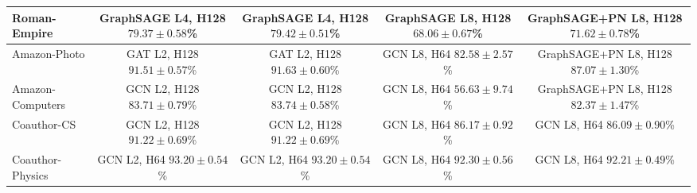 \documentclass[english]{lni}
\begin{document}
\begin{landscape}
\begin{table}[p]
\begin{tabular*}{\linewidth}{@{\extracolsep{\fill}}lcccc@{}}
Roman-Empire &
\makecell{GraphSAGE\\L4, H128\\$79.37\pm0.58$\%} &
\makecell{GraphSAGE\\L4, H128\\$79.42\pm0.51$\%} &
\makecell{GraphSAGE\\L8, H128\\$68.06\pm0.67$\%} &
\makecell{GraphSAGE+PN\\L8, H128\\$71.62\pm0.78$\%}\\
\midrule

Amazon-Photo &
\makecell{GAT\\L2, H128\\$91.51\pm0.57$\%} &
\makecell{GAT\\L2, H128\\$91.63\pm0.60$\%} &
\makecell{GCN\\L8, H64\\$82.58\pm2.57$\%} &
\makecell{GraphSAGE+PN\\L8, H128\\$87.07\pm1.30$\%}\\
\midrule

Amazon-Computers &
\makecell{GCN\\L2, H128\\$83.71\pm0.79$\%} &
\makecell{GCN\\L2, H128\\$83.74\pm0.58$\%} &
\makecell{GCN\\L8, H64\\$56.63\pm9.74$\%} &
\makecell{GraphSAGE+PN\\L8, H128\\$82.37\pm1.47$\%}\\
\midrule

Coauthor-CS &
\makecell{GCN\\L2, H128\\$91.22\pm0.69$\%} &
\makecell{GCN\\L2, H128\\$91.22\pm0.69$\%} &
\makecell{GCN\\L8, H64\\$86.17\pm0.92$\%} &
\makecell{GCN\\L8, H64\\$86.09\pm0.90$\%}\\
\midrule

Coauthor-Physics &
\makecell{GCN\\L2, H64\\$93.20\pm0.54$\%}&
\makecell{GCN\\L2, H64\\$93.20\pm0.54$\%} &
\makecell{GCN\\L8, H64\\$92.30\pm0.56$\%} &
\makecell{GCN\\L8, H64\\$92.21\pm0.49$\%}\\
\midrule


\end{tabular*}
\end{table}
\end{landscape}
\end{document}
